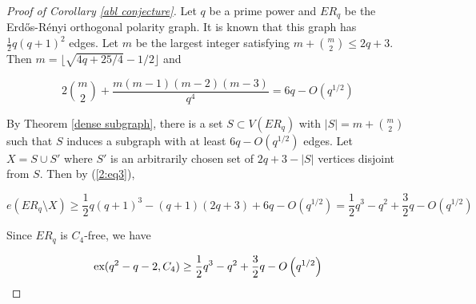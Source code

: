 \documentclass[12pt]{article}
\begin{document}
\begin{proof}[Proof of Corollary \ref{abl conjecture}]
    Let $q$ be a prime power and $ER_q$ be the Erd\H{o}s-R\'{e}nyi orthogonal polarity graph.  It is known that this graph has
    $\frac{1}{2}q(q+1)^2$ edges.  Let $m$ be the largest integer satisfying $m+\binom{m}{2} \leq 2q+3$.
    Then $m = \lfloor \sqrt{4q + 25/4}  - 1/2 \rfloor$ and

    $$ 2 \binom{m}{2} + \frac{ m (m - 1)(m-2)(m-3) }{q^4} = 6q - O(q^{1/2} ) $$

    By Theorem \ref{dense subgraph}, there is a set $S \subset V(ER_q)$ with $|S| = m + \binom{m}{2}$ such that
    $S$ induces a subgraph with at least $6q - O (q^{1/2})$ edges.  Let $X = S \cup S'$ where $S'$ is an arbitrarily chosen set of
    $2q + 3 - |S|$ vertices disjoint from $S$.  Then by (\ref{2:eq3}),

    $$ e( ER_q \setminus X) \geq \frac{1}{2}q(q+1)^3 - (q+1)(2q +3) + 6q - O(q^{1/2} ) =  \frac{1}{2}q^3 - q^2 + \frac{3}{2}q - O\left(q^{1/2}\right) $$

    Since $ER_q$ is $C_4$-free, we have

    $$ \textup{ex}( q^2 - q - 2 , C_4)  \geq \frac{1}{2}q^3 - q^2 + \frac{3}{2}q - O\left(q^{1/2}\right) $$
\end{proof}
\end{document}
